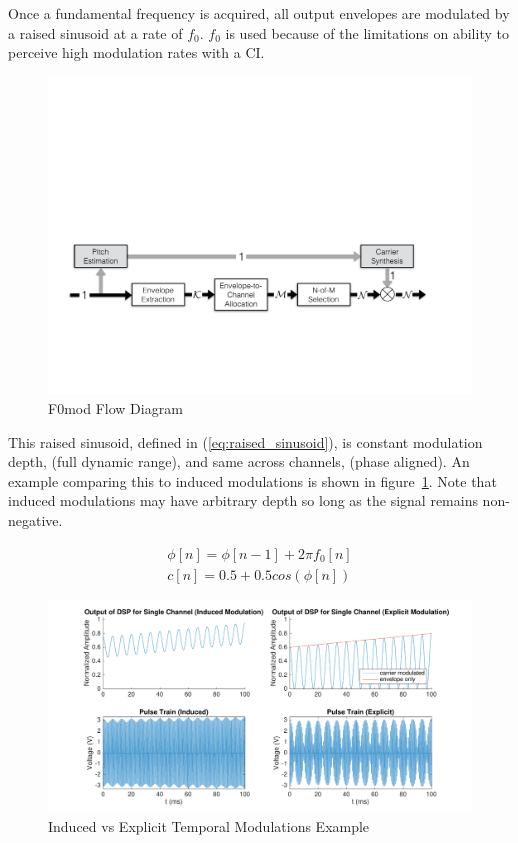 \documentclass [11pt, proquest,oneside] {ganter_thesis}[2015/03/03]
\begin{document}
Once a fundamental frequency is acquired, all output envelopes are modulated by a raised sinusoid at a rate of $f_0$.  $f_0$ is used because of the limitations on ability to perceive high modulation rates with a CI.

\begin{figure}[!ht]
  \centering
    \includegraphics[width=1\textwidth]{F0mod_flow_diagram}   
    \caption{F0mod Flow Diagram}
\end{figure}

This raised sinusoid, defined in (\ref{eq:raised_sinusoid}), is constant modulation depth, (full dynamic range), and same across channels, (phase aligned).  An example comparing this to induced modulations is shown in figure~\ref{fig:induced_vs_explicit}.  Note that induced modulations may have arbitrary depth so long as the signal remains non-negative.

\begin{align}
\label{eq:raised_sinusoid}
\phi[n] = \phi[n - 1] + 2\pi f_0[n] \\
c[n] = 0.5 + 0.5cos(\phi[n])
\end{align}

\begin{figure}[!ht]
  \centering
    \includegraphics[width=1\textwidth]{matlab/induced_vs_explicit}   
    \caption{Induced vs Explicit Temporal Modulations Example}\label{fig:induced_vs_explicit}
\end{figure}
\end{document}
